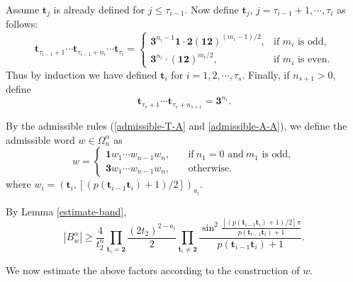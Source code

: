\documentclass[reqno,11pt,graphicx,]{amsart}
\numberwithin{equation}{section}
\theoremstyle{plain}
\newcommand{\3}{\mathbf{3}}
\begin{document}
	Assume $\mathbf{t}_j$ is already defined for $j\leq\tau_{i-1}$. Now define $\mathbf{t}_j$, $j=\tau_{i-1}+1,\cdots,\tau_i$ as follows:
	\begin{equation*}
		\mathbf{t}_{\tau_{i-1}+1}\cdots \mathbf{t}_{\tau_{i-1}+n_i}\cdots \mathbf{t}_{\tau_i}=\begin{cases}
			\mathbf{3}^{n_{i}-1}\mathbf{1}\cdot\mathbf{2}(\mathbf{1}\mathbf{2})^{(m_i-1)/2},&\text{if $m_i$ is odd},\\
			\mathbf{3}^{n_{i}}\cdot(\mathbf{1}\mathbf{2})^{m_i/2},&\text{if $m_i$ is even}.
		\end{cases}
	\end{equation*}
	Thus by induction we have defined $\mathbf{t}_i$ for $i=1,2,\cdots,\tau_s$. Finally, if $n_{s+1}>0$, define 
	\begin{equation*}
		\mathbf{t}_{\tau_s+1}\cdots\mathbf{t}_{\tau_s+n_{s+1}}=
		\mathbf{3}^{n_{i}}.
	\end{equation*}
	
	By the admissible rules (\eqref{admissible-T-A} and \eqref{admissible-A-A}), we define the admissible word $w\in\Omega^{\alpha}_{n}$ as
	\begin{equation*}
		w=\begin{cases}
			\mathbf{1}w_1\cdots w_{n-1}w_{n},\quad&\text{if}\ n_1=0\text{\ and}\ m_1\text{ is odd},\\
			\mathbf{3}w_1\cdots w_{n-1}w_{n},\quad&\text{otherwise}.
		\end{cases}
	\end{equation*} 
	where $w_i=(\mathbf{t}_i,[(p(\mathbf{t}_{i-1}\mathbf{t}_i)+1)/2])_{a_i}$.
	
	By Lemma \ref{estimate-band}, 
	\begin{equation}\label{bw}
		|B_w^\alpha|\ge \frac{4}{t_2^n}\prod_{\mathbf{t}_i=\mathbf{2}}\frac{(2t_2)^{2-a_i}}{2}
		\prod_{\mathbf{t}_i\neq\mathbf{2}}
		\frac{\sin^2\frac{[(p(\mathbf{t}_{i-1}\mathbf{t}_i)+1)/2]\pi}{p(\mathbf{t}_{i-1}\mathbf{t}_i)+1}}
		{p(\mathbf{t}_{i-1}\mathbf{t}_i)+1}.
	\end{equation}
	
	We now estimate the above factors according to the construction of $w$. 
	
\end{document}
